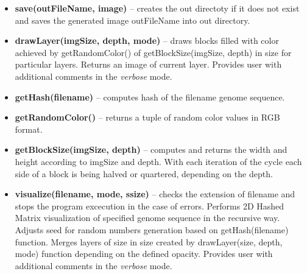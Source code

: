 \begin{itemize}
  \item \textbf{\selectfont save(outFileName, image)} -- creates the {\selectfont out} directoty if it does not exist and saves the generated image {\selectfont outFileName} into {\selectfont out} directory.
  \item \textbf{\selectfont drawLayer(imgSize, depth, mode)} -- draws blocks  filled with color achieved by {\selectfont getRandomColor()} of {\selectfont getBlockSize(imgSize, depth)} in size for particular layers. Returns an image of current layer. Provides user with additional comments in the \textit{verbose} mode.
  \item \textbf{\selectfont getHash(filename)} -- computes hash of the {\selectfont filename} genome sequence.
  \item \textbf{\selectfont getRandomColor()} -- returns a tuple of random color values in RGB format.
  \item \textbf{\selectfont getBlockSize(imgSize, depth)} -- computes and returns the {\selectfont width} and {\selectfont height} according to {\selectfont imgSize} and {\selectfont depth}. With each iteration of the cycle each side of a block is being halved or quartered, depending on the {\selectfont depth}.
  \item \textbf{\selectfont visualize(filename, mode, ssize)} -- checks the extension of {\selectfont filename} and stops the program excecution in the case of errors. Performs 2D Hashed Matrix visualization of specified genome sequence in the recursive way. Adjusts {\selectfont seed } for random numbers generation based on {\selectfont getHash(filename) } function. Merges layers of {\selectfont size} in size created by {\selectfont drawLayer(size, depth, mode) } function depending on the defined {\selectfont opacity}. Provides user with additional comments in the \textit{verbose} mode.
\end{itemize}



